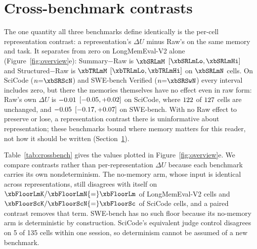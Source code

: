 \section{Cross-benchmark contrasts}
\label{sec:crossbenchtable}
The one quantity all three benchmarks define identically is the per-cell
representation contrast: a representation's $\Delta U$ minus Raw's on the same
memory and task. It separates from zero on LongMemEval-V2 alone
(Figure~\ref{fig:overview}e): Summary$-$Raw is $\xbSRLmM$
$[\xbSRLmLo, \xbSRLmHi]$ and Structured$-$Raw is $\xbTRLmM$
$[\xbTRLmLo, \xbTRLmHi]$ on $\xbSRLmN$ cells. On SciCode ($n{=}\xbSRScN$) and
SWE-bench Verified ($n{=}\xbSRSwN$) every interval includes zero, but there the
memories themselves have no effect even in raw form: Raw's own $\Delta U$ is
$-0.01$ $[-0.05, +0.02]$ on SciCode, where $122$ of
$127$ cells are unchanged, and $-0.05$ $[-0.17, +0.07]$
on SWE-bench. With no Raw effect to preserve or lose, a representation contrast
there is uninformative about representation; these benchmarks bound where
memory matters for this reader, not how it should be written
(Section~\ref{sec:crossbenchtable}).

Table~\ref{tab:crossbench} gives the values plotted in
Figure~\ref{fig:overview}e. We compare contrasts rather than
per-representation $\Delta U$ because each benchmark carries its own
nondeterminism. The no-memory arm, whose input is identical across
representations, still disagrees with itself on
$\xbFloorLmK/\xbFloorLmN{=}\xbFloorLm$ of LongMemEval-V2 cells and
$\xbFloorScK/\xbFloorScN{=}\xbFloorSc$ of SciCode cells, and a paired contrast
removes that term. SWE-bench has no such floor because its no-memory arm is
deterministic by construction. SciCode's equivalent judge control disagrees
on 5 of 135 cells within one session, so determinism cannot be assumed of a
new benchmark.

